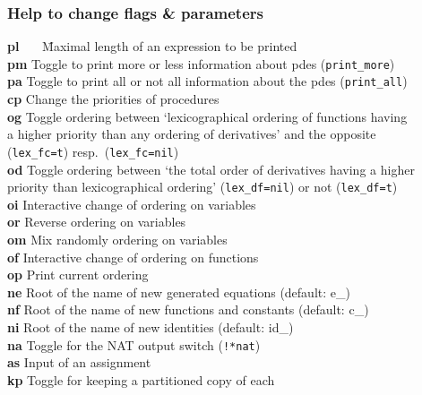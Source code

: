 \documentclass[12pt]{article}
\begin{document}
\subsubsection{Help to change flags \& parameters}
\begin{tabbing}
  {\bf pl} \ \ \ \= Maximal length of an expression to be printed  \\
  {\bf pm}   \> Toggle to print more or less information about
                        pdes ({\tt print\_more})    \\
  {\bf pa}   \> Toggle to print all or not all information
                        about the pdes ({\tt print\_all}) \\
  {\bf cp}   \> Change the priorities of procedures   \\
  {\bf og}   \> Toggle ordering between `lexicographical
                ordering of functions having\\
             \> a higher priority than any ordering of
                derivatives' and the opposite \\
             \> ({\tt lex\_fc=t}) resp.\ ({\tt lex\_fc=nil}) \\
  {\bf od}   \> Toggle ordering between `the total order
                of derivatives having a higher\\
             \> priority than lexicographical ordering'
                ({\tt lex\_df=nil}) or not ({\tt lex\_df=t}) \\
  {\bf oi}   \> Interactive change of ordering on variables \\
  {\bf or}   \> Reverse ordering on variables \\
  {\bf om}   \> Mix randomly ordering on variables \\
  {\bf of}   \> Interactive change of ordering on functions     \\
  {\bf op}   \> Print current ordering  \\
  {\bf ne}   \> Root of the name of new generated equations
                        (default: e\_) \\
  {\bf nf}   \> Root of the name of new functions and constants
                        (default: c\_) \\
  {\bf ni}   \> Root of the name of new identities
                        (default: id\_) \\
  {\bf na}   \> Toggle for the NAT output switch ({\tt !*nat}) \\
  {\bf as}   \> Input of an assignment          \\
  {\bf kp}   \> Toggle for keeping a partitioned copy of each

\end{tabbing}
\end{document}
